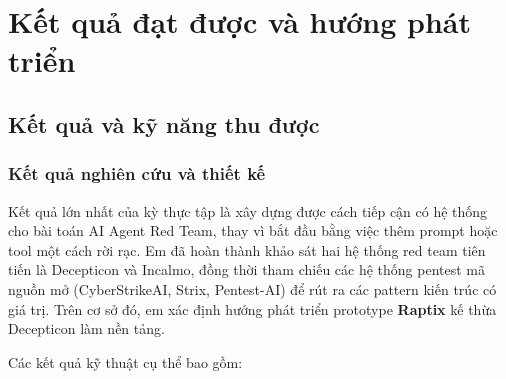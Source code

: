 
\section{Kết quả đạt được và hướng phát triển}
\label{sec:ket-qua-huong-phat-trien}


\subsection{Kết quả và kỹ năng thu được}
\label{sec:ket-qua-ky-nang}

\subsubsection*{Kết quả nghiên cứu và thiết kế}

Kết quả lớn nhất của kỳ thực tập là xây dựng được cách tiếp cận có hệ thống cho bài toán AI Agent Red Team, thay vì bắt đầu bằng việc thêm prompt hoặc tool một cách rời rạc. Em đã hoàn thành khảo sát hai hệ thống red team tiên tiến là Decepticon và Incalmo, đồng thời tham chiếu các hệ thống pentest mã nguồn mở (CyberStrikeAI, Strix, Pentest-AI) để rút ra các pattern kiến trúc có giá trị. Trên cơ sở đó, em xác định hướng phát triển prototype \textbf{Raptix} kế thừa Decepticon làm nền tảng.

Các kết quả kỹ thuật cụ thể bao gồm:

